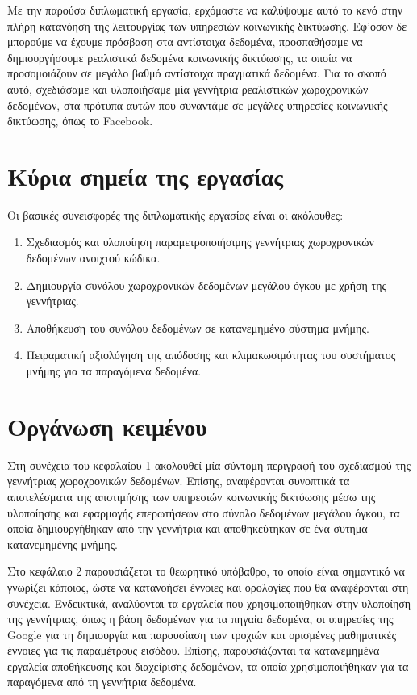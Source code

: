 Με την παρούσα διπλωματική εργασία, ερχόμαστε να καλύψουμε αυτό το κενό στην πλήρη κατανόηση της λειτουργίας των υπηρεσιών κοινωνικής δικτύωσης. 
Εφ'όσον δε μπορούμε να έχουμε πρόσβαση στα αντίστοιχα δεδομένα, προσπαθήσαμε να δημιουργήσουμε ρεαλιστικά \linebreak 
δεδομένα κοινωνικής δικτύωσης, τα οποία να προσομοιάζουν 
σε μεγάλο βαθμό αντίστοιχα \linebreak 
πραγματικά δεδομένα. Για το σκοπό αυτό, σχεδιάσαμε και υλοποιήσαμε μία γεννήτρια ρεαλιστικών χωροχρονικών δεδομένων, στα πρότυπα 
αυτών που συναντάμε σε μεγάλες υπηρεσίες κοινωνικής δικτύωσης, όπως το Facebook. 

\newpage

\section{Κύρια σημεία της εργασίας}

Οι βασικές συνεισφορές της διπλωματικής εργασίας είναι οι ακόλουθες:

\begin{enumerate}
 \item Σχεδιασμός και υλοποίηση παραμετροποιήσιμης γεννήτριας χωροχρονικών δεδομένων \linebreak ανοιχτού κώδικα.
 \item Δημιουργία συνόλου χωροχρονικών δεδομένων μεγάλου όγκου με χρήση της γεννήτριας.
 \item Αποθήκευση του συνόλου δεδομένων σε κατανεμημένο σύστημα μνήμης.
 \item Πειραματική αξιολόγηση της απόδοσης και κλιμακωσιμότητας του συστήματος μνήμης για τα παραγόμενα δεδομένα.
\end{enumerate}

\section{Οργάνωση κειμένου}

Στη συνέχεια του κεφαλαίου 1 ακολουθεί μία σύντομη περιγραφή του σχεδιασμού της \linebreak γεννήτριας χωροχρονικών δεδομένων. Επίσης, αναφέρονται συνοπτικά τα 
αποτελέσματα της αποτιμήσης των υπηρεσιών κοινωνικής δικτύωσης μέσω της υλοποίησης και εφαρμογής \linebreak επερωτήσεων στο σύνολο δεδομένων μεγάλου όγκου, 
τα οποία δημιουργήθηκαν από την γεννήτρια και αποθηκεύτηκαν σε ένα συτημα κατανεμημένης μνήμης.

Στο κεφάλαιο 2 παρουσιάζεται το θεωρητικό υπόβαθρο, το οποίο είναι σημαντικό να γνωρίζει κάποιος, ώστε να κατανοήσει έννοιες και ορολογίες που θα αναφέρονται 
στη συνέχεια. Ενδεικτικά, αναλύονται τα εργαλεία που χρησιμοποιήθηκαν στην υλοποίηση της γεννήτριας, όπως η βάση δεδομένων για τα πηγαία δεδομένα, 
οι υπηρεσίες της Google για τη δημιουργία και παρουσίαση των τροχιών και ορισμένες μαθηματικές έννοιες για τις παραμέτρους εισόδου. Επίσης, \linebreak 
παρουσιάζονται τα κατανεμημένα εργαλεία αποθήκευσης και διαχείρισης δεδομένων, τα οποία χρησιμοποιήθηκαν για τα παραγόμενα από τη γεννήτρια δεδομένα. 

